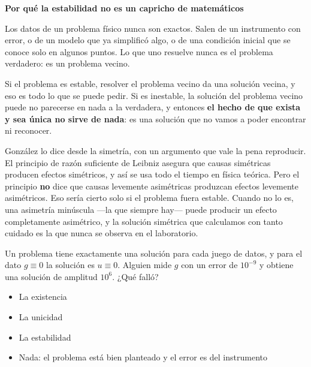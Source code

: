 \documentclass[
  spanish,
  a4paper,
]{scrbook}
\providecommand{\tightlist}{%
  \setlength{\itemsep}{0pt}\setlength{\parskip}{0pt}}
\theoremstyle{definition}
\theoremstyle{plain}
\theoremstyle{definition}
\theoremstyle{plain}
\theoremstyle{definition}
\theoremstyle{remark}
\begin{document}
\begin{tcolorbox}[enhanced jigsaw, arc=.35mm, bottomrule=.15mm, breakable, colback=white, colframe=quarto-callout-important-color-frame, left=2mm, leftrule=.75mm, opacityback=0, rightrule=.15mm, toprule=.15mm]
\begin{minipage}[t]{5.5mm}
\textcolor{quarto-callout-important-color}{\faExclamation}
\end{minipage}%
\begin{minipage}[t]{\textwidth - 5.5mm}

\vspace{-3mm}\textbf{Por qué la estabilidad no es un capricho de matemáticos}\vspace{3mm}

Los datos de un problema físico nunca son exactos. Salen de un
instrumento con error, o de un modelo que ya simplificó algo, o de una
condición inicial que se conoce solo en algunos puntos. Lo que uno
resuelve nunca es el problema verdadero: es un problema vecino.

Si el problema es estable, resolver el problema vecino da una solución
vecina, y eso es todo lo que se puede pedir. Si es inestable, la
solución del problema vecino puede no parecerse en nada a la verdadera,
y entonces \textbf{el hecho de que exista y sea única no sirve de nada}:
es una solución que no vamos a poder encontrar ni reconocer.

González lo dice desde la simetría, con un argumento que vale la pena
reproducir. El principio de razón suficiente de Leibniz asegura que
causas simétricas producen efectos simétricos, y así se usa todo el
tiempo en física teórica. Pero el principio \textbf{no} dice que causas
levemente asimétricas produzcan efectos levemente asimétricos. Eso sería
cierto solo si el problema fuera estable. Cuando no lo es, una asimetría
minúscula ---la que siempre hay--- puede producir un efecto
completamente asimétrico, y la solución simétrica que calculamos con
tanto cuidado es la que nunca se observa en el laboratorio.

\end{minipage}%
\end{tcolorbox}

Un problema tiene exactamente una solución para cada juego de datos, y
para el dato \(g \equiv 0\) la solución es \(u \equiv 0\). Alguien mide
\(g\) con un error de \(10^{-9}\) y obtiene una solución de amplitud
\(10^{6}\). ¿Qué falló?

\begin{itemize}
\tightlist
\item
  {La existencia}
\item
  {La unicidad}
\item
  {La estabilidad}
\item
  {Nada: el problema está bien planteado y el error es del instrumento}
\end{itemize}
\end{document}
